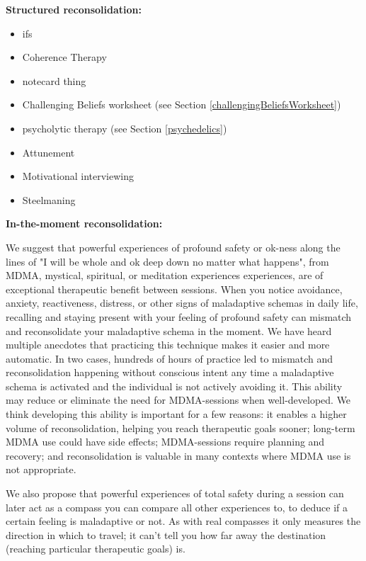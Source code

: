 \documentclass[12pt,letterpaper]{book}
\begin{document}
\vspace{\baselineskip}

\noindent \textbf{Structured reconsolidation:}

\begin{itemize}
	\item ifs
	\item Coherence Therapy
	\item notecard thing
	\item Challenging Beliefs worksheet (see Section \ref{challengingBeliefsWorksheet})
	\item psycholytic therapy (see Section \ref{psychedelics})
	\item Attunement
	\item Motivational interviewing
	\item Steelmaning
\end{itemize}

\noindent \textbf{In-the-moment reconsolidation:}

We suggest that powerful experiences of profound safety or ok-ness along the lines of "I will be whole and ok deep down no matter what happens", from MDMA, mystical, spiritual, or meditation experiences experiences, are of exceptional therapeutic benefit between sessions. When you notice avoidance, anxiety, reactiveness, distress, or other signs of maladaptive schemas in daily life, recalling and staying present with your feeling of profound safety can mismatch and reconsolidate your maladaptive schema in the moment. We have heard multiple anecdotes that practicing this technique makes it easier and more automatic. In two cases, hundreds of hours of practice led to mismatch and reconsolidation happening without conscious intent any time a maladaptive schema is activated and the individual is not actively avoiding it. This ability may reduce or eliminate the need for MDMA-sessions when well-developed. We think developing this ability is important for a few reasons: it enables a higher volume of reconsolidation, helping you reach therapeutic goals sooner; long-term MDMA use could have side effects; MDMA-sessions require planning and recovery; and reconsolidation is valuable in many contexts where MDMA use is not appropriate.

We also propose that powerful experiences of total safety during a session can later act as a compass you can compare all other experiences to, to deduce if a certain feeling is maladaptive or not. As with real compasses it only measures the direction in which to travel; it can’t tell you how far away the destination (reaching particular therapeutic goals) is.
\end{document}
